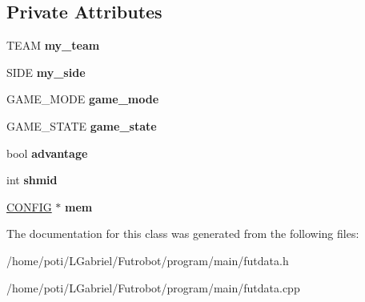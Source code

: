 \subsection*{Private Attributes}
\begin{DoxyCompactItemize}
\item 
T\+E\+AM {\bfseries my\+\_\+team}\hypertarget{classFutData_aaac9c19d2b056d3e87135a78d88a96da}{}\label{classFutData_aaac9c19d2b056d3e87135a78d88a96da}

\item 
S\+I\+DE {\bfseries my\+\_\+side}\hypertarget{classFutData_a3f8c83810e2cd0bef43422379428210c}{}\label{classFutData_a3f8c83810e2cd0bef43422379428210c}

\item 
G\+A\+M\+E\+\_\+\+M\+O\+DE {\bfseries game\+\_\+mode}\hypertarget{classFutData_a79198a65d0a8324abc71393741f4414c}{}\label{classFutData_a79198a65d0a8324abc71393741f4414c}

\item 
G\+A\+M\+E\+\_\+\+S\+T\+A\+TE {\bfseries game\+\_\+state}\hypertarget{classFutData_a720216146cff58a7eb75f91609880d5c}{}\label{classFutData_a720216146cff58a7eb75f91609880d5c}

\item 
bool {\bfseries advantage}\hypertarget{classFutData_a7416b07e297facd67e185df8c3c13ec1}{}\label{classFutData_a7416b07e297facd67e185df8c3c13ec1}

\item 
int {\bfseries shmid}\hypertarget{classFutData_acdacbd1d3e0f325d11799cc222dbabd0}{}\label{classFutData_acdacbd1d3e0f325d11799cc222dbabd0}

\item 
\hyperlink{structCONFIG}{C\+O\+N\+F\+IG} $\ast$ {\bfseries mem}\hypertarget{classFutData_a759c92c19d5cd6f3bdad4737f7d58146}{}\label{classFutData_a759c92c19d5cd6f3bdad4737f7d58146}

\end{DoxyCompactItemize}


The documentation for this class was generated from the following files\+:\begin{DoxyCompactItemize}
\item 
/home/poti/\+L\+Gabriel/\+Futrobot/program/main/futdata.\+h\item 
/home/poti/\+L\+Gabriel/\+Futrobot/program/main/futdata.\+cpp\end{DoxyCompactItemize}
